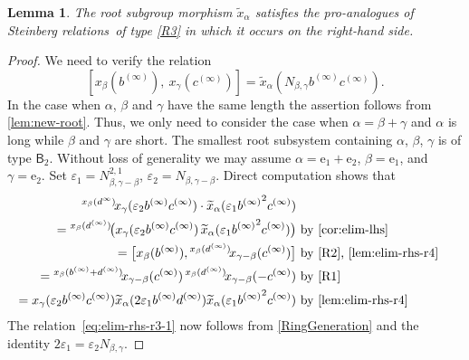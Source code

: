 \documentclass{article}
\numberwithin{equation}{section}
\newtheorem{lemma}{Lemma} \numberwithin{lemma}{section}
\theoremstyle{definition}
\theoremstyle{remark}
\newcommand{\up}[2]{{^{#1}\!{#2}}}
\newcommand{\rB}{\mathsf{B}}
\begin{document}
\begin{lemma} \label{lem:elim-rhs-r3}
 The root subgroup morphism $\widetilde{x}_\alpha$ satisfies the pro-analogues of Steinberg relations~of type \eqref{R3} in which it occurs on the right-hand side.
\end{lemma}
\begin{proof}
We need to verify the relation 
\begin{equation}\label{eq:elim-rhs-r3-1} [x_{\beta}(b^{(\infty)}),\ x_{\gamma}(c^{(\infty)})] = \widetilde{x}_{\alpha}(N_{\beta,\gamma} b^{(\infty)}c^{(\infty)}).\end{equation}
In the case when $\alpha$, $\beta$ and $\gamma$ have the same length the assertion follows from \cref{lem:new-root}. Thus, we only need to consider the case when \(\alpha = \beta + \gamma\) and \(\alpha\) is long while \(\beta\) and \(\gamma\) are short. The smallest root subsystem containing \(\alpha\), \(\beta\), \(\gamma\) is of type \(\rB_2\). Without loss of generality we may assume \(\alpha = \mathrm e_1 + \mathrm e_2\), \(\beta = \mathrm e_1\), and \(\gamma = \mathrm e_2\).
Set $\varepsilon_1 = N_{\beta,\gamma-\beta}^{2,1}$, $\varepsilon_2 = N_{\beta,\gamma-\beta}$. Direct computation shows that \begin{align*}
  \up{x_\beta(d^\infty)} x_\gamma(\varepsilon_2b^{(\infty)}c^{(\infty)}) \cdot \widetilde{x}_\alpha(\varepsilon_1 {b^{(\infty)}}^2{c^{(\infty)}}) \\
  = \up{x_\beta(d^{(\infty)})}
   {\bigl(x_\gamma(\varepsilon_2 b^{(\infty)} c^{(\infty)})\,
   \widetilde x_\alpha(\varepsilon_1
   {b^{(\infty)}}^2 c^{(\infty)})\bigr)} & \text{ by \cref{cor:elim-lhs}}\\
  = \bigl[x_\beta(b^{(\infty)}),
  \up{x_\beta(d^{(\infty)})}
   {x_{\gamma - \beta}(c^{(\infty)})}\bigr] & \text{ by~\eqref{R2}, \cref{lem:elim-rhs-r4}}\\
  = \up{x_\beta(b^{(\infty)} + d^{(\infty)})}
   {x_{\gamma - \beta}(c^{(\infty)})}\,
  \up{x_\beta(d^{(\infty)})}
   {x_{\gamma - \beta}(-c^{(\infty)})} & \text{ by~\eqref{R1}} \\  
  = x_{\gamma}(\varepsilon_2 b^{(\infty)}c^{(\infty)}) \widetilde{x}_{\alpha}(2\varepsilon_1{b^{(\infty)}}{d^{(\infty)}}) \widetilde{x}_\alpha(\varepsilon_1 {b^{(\infty)}}^2{c^{(\infty)}}) & \text{ by~\cref{lem:elim-rhs-r4}}
 \end{align*}
The relation~\eqref{eq:elim-rhs-r3-1} now follows from \cref{RingGeneration} and the identity $2\varepsilon_1 = \varepsilon_2 N_{\beta, \gamma}$. \end{proof} 
\end{document}
